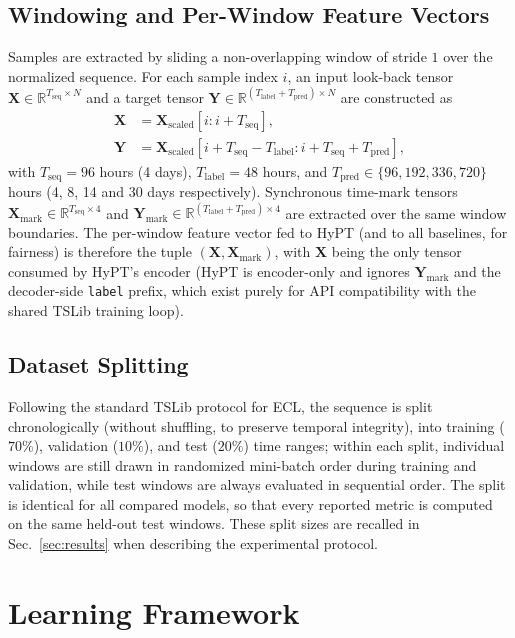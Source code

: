 \documentclass[10pt,journal]{IEEEtran}
\newcommand{\secref}[1]{Sec.~\ref{#1}}
\begin{document}
\subsection{Windowing and Per-Window Feature Vectors}
Samples are extracted by sliding a non-overlapping window of stride $1$ over the normalized sequence. For each sample index $i$, an input look-back tensor $\bm{X} \in \mathbb{R}^{T_{\text{seq}} \times N}$ and a target tensor $\bm{Y} \in \mathbb{R}^{(T_{\text{label}} + T_{\text{pred}}) \times N}$ are constructed as
\begin{align}
\bm{X} &= \bm{X}_{\text{scaled}}[i : i + T_{\text{seq}}], \\
\bm{Y} &= \bm{X}_{\text{scaled}}[i + T_{\text{seq}} - T_{\text{label}} : i + T_{\text{seq}} + T_{\text{pred}}],
\end{align}
with $T_{\text{seq}}=96$ hours (4 days), $T_{\text{label}}=48$ hours, and $T_{\text{pred}} \in \{96, 192, 336, 720\}$ hours (4, 8, 14 and 30 days respectively). Synchronous time-mark tensors $\bm{X}_{\text{mark}} \in \mathbb{R}^{T_{\text{seq}} \times 4}$ and $\bm{Y}_{\text{mark}} \in \mathbb{R}^{(T_{\text{label}}+T_{\text{pred}}) \times 4}$ are extracted over the same window boundaries. The per-window feature vector fed to HyPT (and to all baselines, for fairness) is therefore the tuple $(\bm{X}, \bm{X}_{\text{mark}})$, with $\bm{X}$ being the only tensor consumed by HyPT's encoder (HyPT is encoder-only and ignores $\bm{Y}_{\text{mark}}$ and the decoder-side \texttt{label} prefix, which exist purely for API compatibility with the shared TSLib training loop).

\subsection{Dataset Splitting}
Following the standard TSLib protocol for ECL, the sequence is split chronologically (without shuffling, to preserve temporal integrity), into training ($70\%$), validation ($10\%$), and test ($20\%$) time ranges; within each split, individual windows are still drawn in randomized mini-batch order during training and validation, while test windows are always evaluated in sequential order. The split is identical for all compared models, so that every reported metric is computed on the same held-out test windows. These split sizes are recalled in \secref{sec:results} when describing the experimental protocol.

\section{Learning Framework}
\label{sec:framework}
\end{document}
